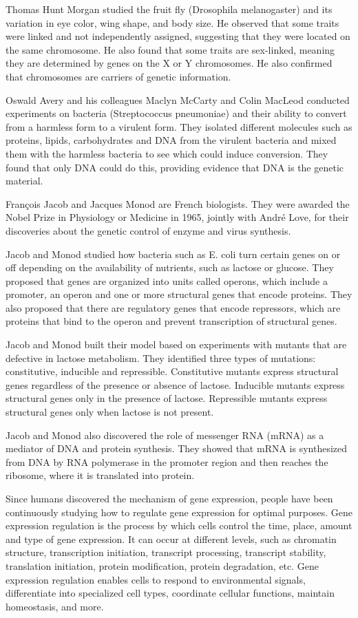 \documentclass[sn-standardnature]{sn-jnl}%
\theoremstyle{thmstyleone}%
\theoremstyle{thmstyletwo}%
\theoremstyle{thmstylethree}%
\begin{document}
Thomas Hunt Morgan studied the fruit fly (Drosophila melanogaster) and its variation in eye color, wing shape, and body size. He observed that some traits were linked and not independently assigned, suggesting that they were located on the same chromosome. He also found that some traits are sex-linked, meaning they are determined by genes on the X or Y chromosomes. He also confirmed that chromosomes are carriers of genetic information.

Oswald Avery and his colleagues Maclyn McCarty and Colin MacLeod conducted experiments on bacteria (Streptococcus pneumoniae) and their ability to convert from a harmless form to a virulent form. They isolated different molecules such as proteins, lipids, carbohydrates and DNA from the virulent bacteria and mixed them with the harmless bacteria to see which could induce conversion. They found that only DNA could do this, providing evidence that DNA is the genetic material.

François Jacob and Jacques Monod are French biologists. They were awarded the Nobel Prize in Physiology or Medicine in 1965, jointly with André Love, for their discoveries about the genetic control of enzyme and virus synthesis.

Jacob and Monod studied how bacteria such as E. coli turn certain genes on or off depending on the availability of nutrients, such as lactose or glucose. They proposed that genes are organized into units called operons, which include a promoter, an operon and one or more structural genes that encode proteins. They also proposed that there are regulatory genes that encode repressors, which are proteins that bind to the operon and prevent transcription of structural genes.

Jacob and Monod built their model based on experiments with mutants that are defective in lactose metabolism. They identified three types of mutations: constitutive, inducible and repressible. Constitutive mutants express structural genes regardless of the presence or absence of lactose. Inducible mutants express structural genes only in the presence of lactose. Repressible mutants express structural genes only when lactose is not present.

Jacob and Monod also discovered the role of messenger RNA (mRNA) as a mediator of DNA and protein synthesis. They showed that mRNA is synthesized from DNA by RNA polymerase in the promoter region and then reaches the ribosome, where it is translated into protein.

Since humans discovered the mechanism of gene expression, people have been continuously studying how to regulate gene expression for optimal purposes\cite{schug2010promoter,lee2004transcriptional,maston2006transcriptional}. Gene expression regulation is the process by which cells control the time, place, amount and type of gene expression. It can occur at different levels, such as chromatin structure, transcription initiation, transcript processing, transcript stability, translation initiation, protein modification, protein degradation, etc. Gene expression regulation enables cells to respond to environmental signals, differentiate into specialized cell types, coordinate cellular functions, maintain homeostasis, and more.
\end{document}
